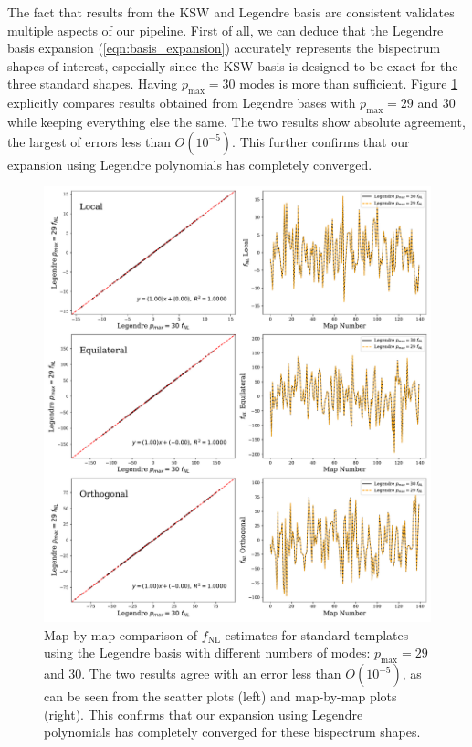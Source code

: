The fact that results from the KSW and Legendre basis are consistent validates multiple aspects of our pipeline. First of all, we can deduce that the Legendre basis expansion (\ref{eqn:basis_expansion}) accurately represents the bispectrum shapes of interest, especially since the KSW basis is designed to be exact for the three standard shapes. Having $p_\text{max}=30$ modes is more than sufficient. Figure \ref{fig:map_by_map_Legendre_30_29} explicitly compares results obtained from Legendre bases with $p_\text{max}=29$ and $30$ while keeping everything else the same. The two results show absolute agreement, the largest of errors less than $O(10^{-5})$. This further confirms that our expansion using Legendre polynomials has completely converged.

\begin{figure}[htbp!] 
	\centering    
	\includegraphics[width=\textwidth]{map_by_map_Legendre_30_29.pdf}
	\caption{Map-by-map comparison of $f_\text{NL}$ estimates for standard templates using the Legendre basis with different numbers of modes: $p_\text{max}=29$ and $30$. The two results agree with an error less than $O(10^{-5})$, as can be seen from the scatter plots (left) and map-by-map plots (right). This confirms that our expansion using Legendre polynomials has completely converged for these bispectrum shapes.}
	\label{fig:map_by_map_Legendre_30_29}
\end{figure}

